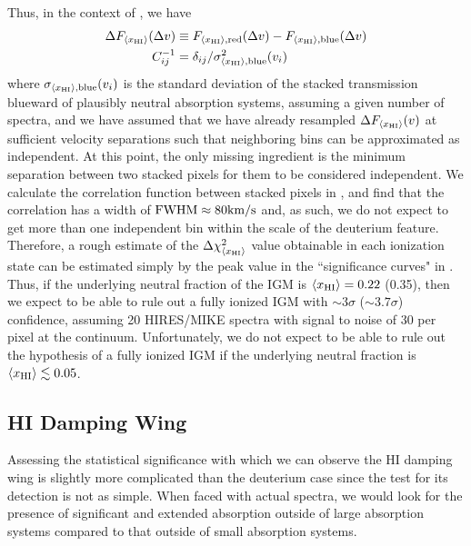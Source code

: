  
Thus, in the context of , we have 
\begin{align}
\Delta F_{\langle x_{\text{HI}}\rangle}(\Delta v) &\equiv F_{\langle x_{\text{HI}}\rangle,\text{red}}(\Delta v) - F_{\langle x_{\text{HI}}\rangle,\text{blue}}(\Delta v) \\
C^{-1}_{ij} &= \delta_{ij} /\sigma^2_{\langle x_{\text{HI}}\rangle,\text{blue}}(v_i)
\end{align}
where $\sigma_{\langle x_{\text{HI}}\rangle,\text{blue}}(v_i)$ is the standard deviation of the stacked transmission blueward of plausibly neutral absorption systems, assuming a given number of spectra, and we have assumed that we have already resampled $\Delta F_{\langle x_{\text{HI}}\rangle}(v)$ at sufficient velocity separations such that neighboring bins can be approximated as independent. At this point, the only missing ingredient is the minimum separation between two stacked pixels for them to be considered independent. We calculate the correlation function between stacked pixels in \lyb, and find that the correlation has a width of $\text{FWHM} \approx 80\text{km}/\text{s}$ and, as such, we do not expect to get more than one independent bin within the scale of the deuterium feature. Therefore, a rough estimate of the $\Delta \chi^2_{\langle x_{\text{HI}}\rangle}$ value obtainable in each ionization state can be estimated simply by the peak value in the ``significance curves" in . Thus, if the underlying neutral fraction of the IGM is $\langle x_{\text{HI}}\rangle = 0.22$ (0.35), then we expect to be able to rule out a fully ionized IGM with $\sim3\sigma$ ($\sim 3.7 \sigma$) confidence, assuming 20 HIRES/MIKE spectra with signal to noise of 30 per pixel at the continuum. Unfortunately, we do not expect to be able to rule out the hypothesis of a fully ionized IGM if the underlying neutral fraction is $\langle x_{\text{HI}}\rangle \lesssim 0.05$.



\subsection{HI Damping Wing} \label{sec:HIForecast}

 
 Assessing the statistical significance with which we can observe the HI damping wing is slightly more complicated than the deuterium case since the test for its detection is not as simple. When faced with actual spectra, we would look for the presence of significant and extended absorption outside of large absorption systems compared to that outside of small absorption systems. 


